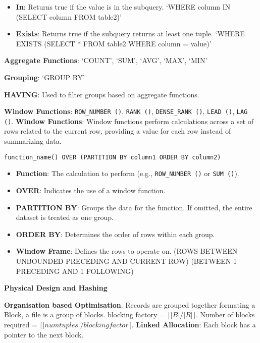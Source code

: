 \documentclass{article}
\begin{document}
\begin{itemize}
    \item \textbf{In}: Returns true if the value is in the subquery. `WHERE column IN (SELECT column FROM table2)'
    \item \textbf{Exists}: Returns true if the subquery returns at least one tuple. `WHERE EXISTS (SELECT * FROM table2 WHERE column = value)'
\end{itemize}

\noindent \textbf{Aggregate Functions}: `COUNT', `SUM', `AVG', `MAX', `MIN'

\noindent \textbf{Grouping}: `GROUP BY'

\noindent \textbf{HAVING}: Used to filter groups based on aggregate functions.

\noindent \textbf{Window Functions}: \texttt{ROW\_NUMBER ()}, \texttt{RANK ()}, \texttt{DENSE\_RANK ()}, \texttt{LEAD ()}, \texttt{LAG ()}.
\noindent \textbf{Window Functions}: Window functions perform calculations across a set of rows related to the current row, providing a value for each row instead of summarizing data.
\begin{verbatim}
function_name() OVER (PARTITION BY column1 ORDER BY column2)
\end{verbatim}
\begin{itemize}
    \item \textbf{Function}: The calculation to perform (e.g., \texttt{ROW\_NUMBER ()} or \texttt{SUM ()}).
    \item \textbf{OVER}: Indicates the use of a window function.
    \item \textbf{PARTITION BY}: Groups the data for the function. If omitted, the entire dataset is treated as one group.
    \item \textbf{ORDER BY}: Determines the order of rows within each group.
    \item \textbf{Window Frame}: Defines the rows to operate on. (ROWS BETWEEN UNBOUNDED PRECEDING AND CURRENT ROW)
    (BETWEEN 1 PRECEDING AND 1 FOLLOWING)
\end{itemize}

\noindent \textbf{Physical Design and Hashing}

\noindent \textbf{Organisation based Optimisation}. Records are grouped together formating a Block, a file is a group of blocks.
blocking factory = $\lfloor \lvert B \rvert / \lvert R \rvert \rfloor$. Number of blocks required = $\lceil \lvert num tuples \rvert / blocking factor \rceil$.
\textbf{Linked Allocation}: Each block has a pointer to the next block.
\end{document}
